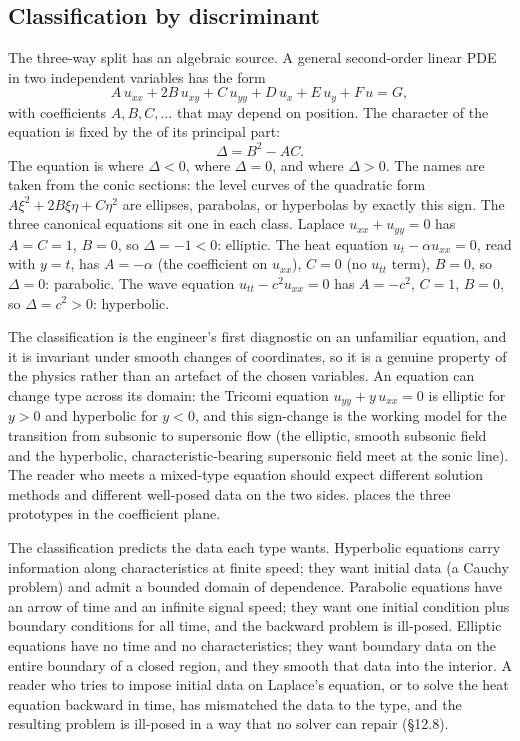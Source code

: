 \subsection{Classification by discriminant}

The three-way split has an algebraic source. A general
second-order linear PDE in two independent variables has the form
\[
A\, u_{xx} + 2B\, u_{xy} + C\, u_{yy} + D\, u_{x} + E\, u_{y} + F\, u = G,
\]
with coefficients $A, B, C, \ldots$ that may depend on position.
The character of the equation is fixed by the
 of its principal part:
\[
\Delta = B^{2} - AC.
\]
The equation is  where $\Delta < 0$,
 where $\Delta = 0$, and 
where $\Delta > 0$. The names are taken from the conic sections:
the level curves of the quadratic form $A\xi^{2} + 2B\xi\eta +
C\eta^{2}$ are ellipses, parabolas, or hyperbolas by exactly this
sign. The three canonical equations sit one in each class. Laplace
$u_{xx} + u_{yy} = 0$ has $A = C = 1$, $B = 0$, so $\Delta = -1 <
0$: elliptic. The heat equation $u_{t} - \alpha u_{xx} = 0$, read
with $y = t$, has $A = -\alpha$ (the coefficient on $u_{xx}$), $C =
0$ (no $u_{tt}$ term), $B = 0$, so $\Delta = 0$: parabolic. The
wave equation $u_{tt} - c^{2} u_{xx} = 0$ has $A = -c^{2}$, $C =
1$, $B = 0$, so $\Delta = c^{2} > 0$: hyperbolic.

The classification is the engineer's first diagnostic on an
unfamiliar equation, and it is invariant under smooth changes of
coordinates, so it is a genuine property of the physics rather than
an artefact of the chosen variables. An equation can change type
across its domain: the Tricomi equation $u_{yy} + y\, u_{xx} = 0$
is elliptic for $y > 0$ and hyperbolic for $y < 0$, and this
sign-change is the working model for the transition from subsonic
to supersonic flow (the elliptic, smooth subsonic field and the
hyperbolic, characteristic-bearing supersonic field meet at the
sonic line). The reader who meets a mixed-type equation should
expect different solution methods and different well-posed data on
the two sides.  places the
three prototypes in the coefficient plane.



The classification predicts the data each type wants.
Hyperbolic equations carry information along characteristics at
finite speed; they want initial data (a Cauchy problem) and admit
a bounded domain of dependence. Parabolic equations have an arrow
of time and an infinite signal speed; they want one initial
condition plus boundary conditions for all time, and the backward
problem is ill-posed. Elliptic equations have no time and no
characteristics; they want boundary data on the entire boundary of
a closed region, and they smooth that data into the interior. A
reader who tries to impose initial data on Laplace's equation, or
to solve the heat equation backward in time, has mismatched the
data to the type, and the resulting problem is ill-posed in a way
that no solver can repair (\S12.8).

